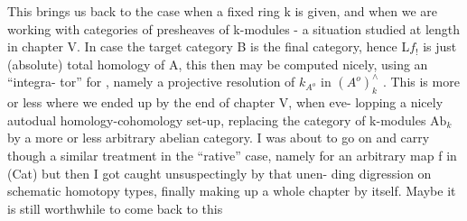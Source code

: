 This brings us back to the case when a fixed ring k is given,
and when we are working with categories of presheaves of k-modules
- a situation studied at length in chapter V. In case the target
category B is the final category, hence L$f_{!}$ is just (absolute) total
homology of A, this then may be computed nicely, using an ``integra-%
tor'' for  , namely a projective resolution of $k_{A^o}$ in $(A^o)^{\wedge}_{k}$ . This
is more or less where we ended up  by the end of chapter V, when eve-%
 lopping a nicely autodual homology-cohomology set-up, 
replacing the category of k-modules $\mathrm{Ab}_k$ by a more or less arbitrary
abelian category. I was about to  go on and carry though
a similar treatment in the ``rative'' case, namely for an arbitrary
map f in (Cat) \xout{\unsure{,}}\hand{(}but then I got caught unsuspectingly by that unen-%
ding digression on schematic homotopy types, finally making up a whole
chapter by itself\hand{)}. Maybe it is still worthwhile to come back to this\hand{,}

